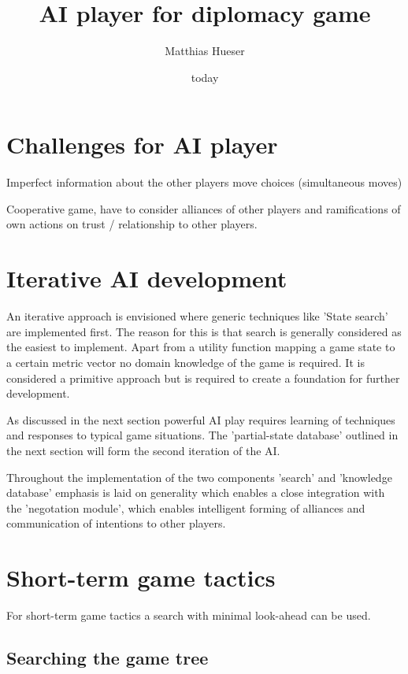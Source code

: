 \documentclass[12pt]{article}
\title{AI player for diplomacy game}
\author{Matthias Hueser}
\date{today}
\begin{document}
\maketitle

\section{Challenges for AI player}

Imperfect information about the other players
move choices (simultaneous moves)

Cooperative game, have to consider alliances of 
other players and ramifications of own actions
on trust / relationship to other players.

\section{Iterative AI development}

An iterative approach is envisioned where generic techniques
like 'State search' are implemented first. The reason for this is that 
search is generally considered as the easiest to implement. Apart from
a utility function mapping a game state to a certain metric vector no 
domain knowledge of the game is required. It is considered a primitive
approach but is required to create a foundation for further development.

As discussed in the next section powerful AI play requires learning of
techniques and responses to typical game situations. The 'partial-state
database' outlined in the next section will form the second iteration
of the AI. 

Throughout the implementation of the two components 'search' and 'knowledge
database' emphasis is laid on generality which enables a close integration
with the 'negotation module', which enables intelligent forming of 
alliances and communication of intentions to other players.

\section{Short-term game tactics}

For short-term game tactics a search with minimal look-ahead can be used.

\subsection{Searching the game tree}
\end{document}
